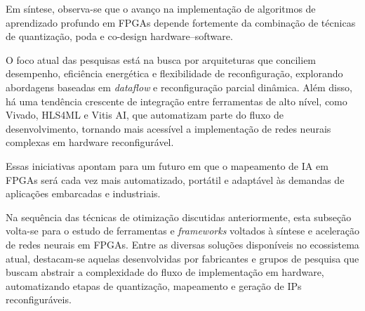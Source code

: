 %

Em síntese, observa-se que o avanço na implementação de algoritmos de aprendizado profundo em FPGAs depende fortemente da combinação de técnicas de quantização, poda e co-design hardware–software.

O foco atual das pesquisas está na busca por arquiteturas que conciliem desempenho, eficiência energética e flexibilidade de reconfiguração, explorando abordagens baseadas em \textit{dataflow} e reconfiguração parcial dinâmica. Além disso, há uma tendência crescente de integração entre ferramentas de alto nível, como Vivado, HLS4ML e Vitis AI, que automatizam parte do fluxo de desenvolvimento, tornando mais acessível a implementação de redes neurais complexas em hardware reconfigurável.

Essas iniciativas apontam para um futuro em que o mapeamento de IA em FPGAs será cada vez mais automatizado, portátil e adaptável às demandas de aplicações embarcadas e industriais.

Na sequência das técnicas de otimização discutidas anteriormente, esta subseção volta-se para o estudo de ferramentas e \textit{frameworks} voltados à síntese e aceleração de redes neurais em FPGAs. Entre as diversas soluções disponíveis no ecossistema atual, destacam-se aquelas desenvolvidas por fabricantes e grupos de pesquisa que buscam abstrair a complexidade do fluxo de implementação em hardware, automatizando etapas de quantização, mapeamento e geração de IPs reconfiguráveis.

